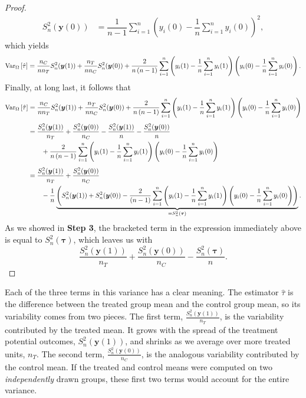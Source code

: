 \documentclass[12pt,leqno]{article}
\theoremstyle{newstyle}
\newcommand{\bZ}{\bm{Z}}   \newcommand{\bz}{\bm{z}}   %
\newcommand{\po}[2]{y_{#1}(#2)}     %
\newcommand{\pov}[1]{\bm{y}(#1)}    %
\newcommand{\tauhat}{\hat{\tau}}
\newcommand{\Ssq}[2][n]{S_{#1}^{2}(#2)}
\begin{document}
\begin{proof}
\begin{align*}
\Ssq{\pov{0}} & = \dfrac{1}{n - 1} \sum \limits_{i = 1}^n \left(\po{i}{0} - \dfrac{1}{n} \sum \limits_{i = 1}^n \po{i}{0}\right)^2,
\end{align*}
\normalsize
which yields
\small
\begin{equation*}
\VarZ\left[\tauhat\right] = \dfrac{n_C}{n n_T} \Ssq{\pov{1}} + \dfrac{n_T}{n n_C} \Ssq{\pov{0}} + \dfrac{2}{n \left(n - 1\right)} \sum \limits_{i = 1}^n \left(\po{i}{1} - \dfrac{1}{n} \sum \limits_{i = 1}^n \po{i}{1}\right)\left(\po{i}{0} - \dfrac{1}{n} \sum \limits_{i = 1}^n \po{i}{0}\right).
\end{equation*}
\normalsize
Finally, at long last, it follows that
\small
\begin{align*}
\VarZ\left[\tauhat\right] & = \dfrac{n_C}{n n_T} \Ssq{\pov{1}} + \dfrac{n_T}{n n_C} \Ssq{\pov{0}} + \dfrac{2}{n \left(n - 1\right)} \sum \limits_{i = 1}^n \left(\po{i}{1} - \dfrac{1}{n} \sum \limits_{i = 1}^n \po{i}{1}\right)\left(\po{i}{0} - \dfrac{1}{n} \sum \limits_{i = 1}^n \po{i}{0}\right) \notag \\[1ex]
& = \dfrac{\Ssq{\pov{1}}}{n_T} + \dfrac{\Ssq{\pov{0}}}{n_C} - \dfrac{\Ssq{\pov{1}}}{n} - \dfrac{\Ssq{\pov{0}}}{n} \notag \\
& \qquad + \dfrac{2}{n \left(n - 1\right)} \sum \limits_{i = 1}^n \left(\po{i}{1} - \dfrac{1}{n} \sum \limits_{i = 1}^n \po{i}{1}\right)\left(\po{i}{0} - \dfrac{1}{n} \sum \limits_{i = 1}^n \po{i}{0}\right) \notag \\[1ex]
& = \dfrac{\Ssq{\pov{1}}}{n_T} + \dfrac{\Ssq{\pov{0}}}{n_C} \\
& \qquad - \dfrac{1}{n}\underbrace{\left(\Ssq{\pov{1}} + \Ssq{\pov{0}} - \dfrac{2}{\left(n - 1\right)} \sum \limits_{i = 1}^n \left(\po{i}{1} - \dfrac{1}{n} \sum \limits_{i = 1}^n \po{i}{1}\right)\left(\po{i}{0} - \dfrac{1}{n} \sum \limits_{i = 1}^n \po{i}{0}\right)\right)}_{= \Ssq{\bm{\tau}}}.
\end{align*}
\normalsize
As we showed in \textbf{Step 3}, the bracketed term in the expression immediately above is equal to $\Ssq{\bm{\tau}}$, which leaves us with
\small
\begin{equation}
\label{eq: var diff means}
\dfrac{\Ssq{\pov{1}}}{n_T} + \dfrac{\Ssq{\pov{0}}}{n_C} - \dfrac{\Ssq{\bm{\tau}}}{n}.
\end{equation}
\normalsize
\end{proof}

Each of the three terms in this variance has a clear meaning. The estimator $\tauhat$ is the difference between the treated group mean and the control group mean, so its variability comes from two pieces. The first term, $\frac{\Ssq{\pov{1}}}{n_T}$, is the variability contributed by the treated mean. It grows with the spread of the treatment potential outcomes, $\Ssq{\pov{1}}$, and shrinks as we average over more treated units, $n_T$. The second term, $\frac{\Ssq{\pov{0}}}{n_C}$, is the analogous variability contributed by the control mean. If the treated and control means were computed on two \textit{independently} drawn groups, these first two terms would account for the entire variance.
\end{document}
